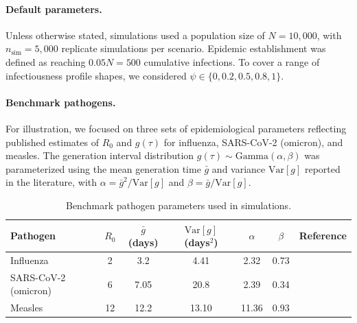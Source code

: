 \paragraph{Default parameters.}
Unless otherwise stated, simulations used a population size of $N = 10{,}000$, with $n_{\text{sim}} = 5{,}000$ replicate simulations per scenario. Epidemic establishment was defined as reaching $0.05 N = 500$ cumulative infections. To cover a range of infectiousness profile shapes, we considered $\psi \in \{0, 0.2, 0.5, 0.8, 1\}$.

\paragraph{Benchmark pathogens.}
For illustration, we focused on three sets of epidemiological parameters reflecting published estimates of $R_0$ and $g(\tau)$ for influenza, SARS-CoV-2 (omicron), and measles. The generation interval distribution $g(\tau) \sim \text{Gamma}(\alpha, \beta)$ was parameterized using the mean generation time $\bar{g}$ and variance $\text{Var}[g]$ reported in the literature, with $\alpha = \bar{g}^2 / \text{Var}[g]$ and $\beta = \bar{g} / \text{Var}[g]$.

\begin{table}[h]
\centering
\begin{tabular}{lcccccc}
\hline
Pathogen & $R_0$ & $\bar{g}$ (days) & $\text{Var}[g]$ (days$^2$) & $\alpha$ & $\beta$ & Reference\\
\hline
Influenza & 2 & 3.2 & 4.41 & 2.32 & 0.73 & \citep{chan_estimating_2025}\\
SARS-CoV-2 (omicron) & 6 & 7.05 & 20.8 & 2.39 & 0.34 & \citep{manica_intrinsic_2022}\\
Measles & 12 & 12.2 & 13.10 & 11.36 & 0.93 & \citep{klinkenberg_correlation_2011}\\
\hline
\end{tabular}
\caption{Benchmark pathogen parameters used in simulations.}
\label{tab:benchmark_pathogens}
\end{table}


